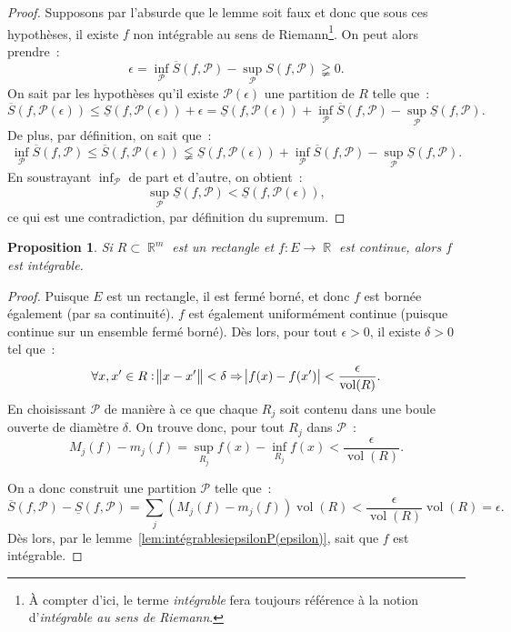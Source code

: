 \documentclass{article}
\DeclareMathOperator{\R}{\mathbb R}
\DeclareMathOperator{\vol}{vol}
\newtheorem{prp}[thm]{Proposition}
\theoremstyle{definition}
\theoremstyle{remark}
\begin{document}
		\begin{proof} Supposons par l'absurde que le lemme soit faux et donc que sous ces hypothèses, il existe $f$ non intégrable au sens de Riemann\footnote{
		À compter d'ici, le terme \emph{intégrable} fera toujours référence à la notion d'\emph{intégrable au sens de Riemann}.}. On peut alors prendre~:
		\[\epsilon = \inf_{\mathcal P}\overline S(f, \mathcal P) - \sup_{\mathcal P}S(f, \mathcal P) \gneqq 0.\]
		On sait par les hypothèses qu'il existe $\mathcal P(\epsilon)$ une partition de $R$ telle que~:
		\[\overline S(f, \mathcal P(\epsilon)) \leq \underline S(f, \mathcal P(\epsilon)) + \epsilon
		= \underline S(f, \mathcal P(\epsilon)) + \inf_{\mathcal P}\overline S(f, \mathcal P) - \sup_{\mathcal P}\underline S(f, \mathcal P).\]
		De plus, par définition, on sait que~:
		\[\inf_{\mathcal P}\overline S(f, \mathcal P) \leq \overline S(f, \mathcal P(\epsilon))
		\lneqq \underline S(f, \mathcal P(\epsilon)) + \inf_{\mathcal P}\overline S(f, \mathcal P) - \sup_{\mathcal P}\underline S(f, \mathcal P).\]
		En soustrayant $\inf_{\mathcal P}$ de part et d'autre, on obtient~:
		\[\sup_{\mathcal P}\underline S(f, \mathcal P) < \underline S(f, \mathcal P(\epsilon)),\]
		ce qui est une contradiction, par définition du supremum.
		\end{proof}

		\begin{prp} Si $R \subset \R^m$ est un rectangle et $f : E \to \R$ est continue, alors $f$ est intégrable. \end{prp}

		\begin{proof} Puisque $E$ est un rectangle, il est fermé borné, et donc $f$ est bornée également (par sa continuité). $f$ est également uniformément
		continue (puisque continue sur un ensemble fermé borné). Dès lors, pour tout $\epsilon > 0$, il existe $\delta > 0$ tel que~:
		\[\forall x, x' \in R : \norm{x-x'} < \delta \Rightarrow \abs{f(x)-f(x')} < \frac \epsilon{\vol(R)}.\]
		En choisissant $\mathcal P$ de manière à ce que chaque $R_j$ soit contenu dans une boule ouverte de diamètre $\delta$. On trouve donc, pour tout
		$R_j$ dans $\mathcal P$~:
		\[M_j(f) - m_j(f) = \sup_{R_j}f(x) - \inf_{R_j}f(x) < \frac \epsilon{\vol(R)}.\]

		On a donc construit une partition $\mathcal P$ telle que~:
		\[\overline S(f, \mathcal P) - \underline S(f, \mathcal P) = \sum_j\left(M_j(f)-m_j(f)\right)\vol(R) < \frac \epsilon{\vol(R)}\vol(R) = \epsilon.\]
		Dès lors, par le lemme~\ref{lem:intégrablesiepsilonP(epsilon)}, sait que $f$ est intégrable.
		\end{proof}
\end{document}
